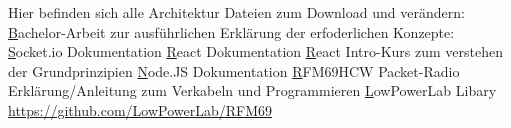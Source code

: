 \documentclass[12pt]{article} %
\begin{document}
Hier befinden sich alle Architektur Dateien zum Download und verändern:  
\href{https://www.icloud.com/numbers/0841q8aak3co6xR5aNUxTdjNQ#EscapeUML}
Bachelor-Arbeit zur ausführlichen Erklärung der erfoderlichen Konzepte:
\href{https://github.com/reflaxo/BachelorThesisCW/blob/master/main.pdf}
Socket.io Dokumentation
\href{https://socket.io/}
React Dokumentation
\href{https://reactjs.org/}
React Intro-Kurs zum verstehen der Grundprinzipien
\href{https://www.codecademy.com/learn/react-101}
Node.JS Dokumentation
\href{https://nodejs.org/en/docs/guides/}
RFM69HCW Packet-Radio Erklärung/Anleitung zum Verkabeln und Programmieren
\href{https://learn.adafruit.com/adafruit-rfm69hcw-and-rfm96-rfm95-rfm98-lora-packet-padio-breakouts/overview}
LowPowerLab Libary
\href{https://github.com/LowPowerLab/RFM69}{https://github.com/LowPowerLab/RFM69}


\end{document}
